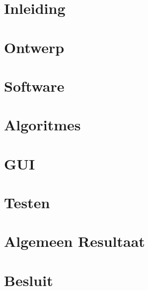 \documentclass[eind]{penoverslag}
\begin{document}
\maketitlepage


\begin{abstract}



\end{abstract}


\tableofcontents\newpage

\section*{Inleiding}
\label{sec:Inleiding}

\newpage

\section{Ontwerp}
\label{sec:Ontwerp}



\section{Software}
\label{sec:Software}



\section{Algoritmes}
\label{sec:Algoritmes}



\newpage
\section{GUI}
\label{sec:GUI}



\section{Testen}
\label{sec:Testen}



\section*{Algemeen Resultaat}
\label{sec:AlgemeenResultaat}



\section*{Besluit}
\label{sec:Besluit}






\end{document}
